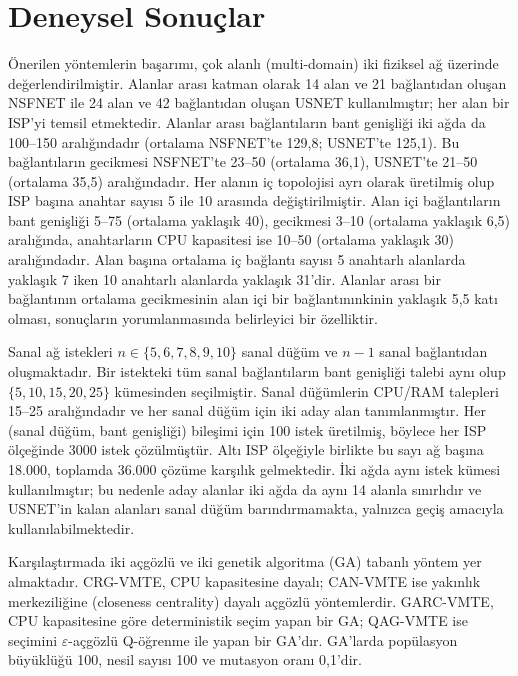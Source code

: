 \documentclass[10pt,twocolumn]{article}
\begin{document}
\section{Deneysel Sonuçlar}

Önerilen yöntemlerin başarımı, çok alanlı (multi-domain) iki fiziksel ağ üzerinde değerlendirilmiştir. Alanlar arası katman olarak 14 alan ve 21 bağlantıdan oluşan NSFNET ile 24 alan ve 42 bağlantıdan oluşan USNET kullanılmıştır; her alan bir ISP'yi temsil etmektedir. Alanlar arası bağlantıların bant genişliği iki ağda da 100--150 aralığındadır (ortalama NSFNET'te 129,8; USNET'te 125,1). Bu bağlantıların gecikmesi NSFNET'te 23--50 (ortalama 36,1), USNET'te 21--50 (ortalama 35,5) aralığındadır. Her alanın iç topolojisi ayrı olarak üretilmiş olup ISP başına anahtar sayısı 5 ile 10 arasında değiştirilmiştir. Alan içi bağlantıların bant genişliği 5--75 (ortalama yaklaşık 40), gecikmesi 3--10 (ortalama yaklaşık 6,5) aralığında, anahtarların CPU kapasitesi ise 10--50 (ortalama yaklaşık 30) aralığındadır. Alan başına ortalama iç bağlantı sayısı 5 anahtarlı alanlarda yaklaşık 7 iken 10 anahtarlı alanlarda yaklaşık 31'dir. Alanlar arası bir bağlantının ortalama gecikmesinin alan içi bir bağlantınınkinin yaklaşık 5,5 katı olması, sonuçların yorumlanmasında belirleyici bir özelliktir.

Sanal ağ istekleri $n \in \{5,6,7,8,9,10\}$ sanal düğüm ve $n-1$ sanal bağlantıdan oluşmaktadır. Bir istekteki tüm sanal bağlantıların bant genişliği talebi aynı olup $\{5,10,15,20,25\}$ kümesinden seçilmiştir. Sanal düğümlerin CPU/RAM talepleri 15--25 aralığındadır ve her sanal düğüm için iki aday alan tanımlanmıştır. Her (sanal düğüm, bant genişliği) bileşimi için 100 istek üretilmiş, böylece her ISP ölçeğinde 3000 istek çözülmüştür. Altı ISP ölçeğiyle birlikte bu sayı ağ başına 18.000, toplamda 36.000 çözüme karşılık gelmektedir. İki ağda aynı istek kümesi kullanılmıştır; bu nedenle aday alanlar iki ağda da aynı 14 alanla sınırlıdır ve USNET'in kalan alanları sanal düğüm barındırmamakta, yalnızca geçiş amacıyla kullanılabilmektedir.

Karşılaştırmada iki açgözlü ve iki genetik algoritma (GA) tabanlı yöntem yer almaktadır. CRG-VMTE, CPU kapasitesine dayalı; CAN-VMTE ise yakınlık merkeziliğine (closeness centrality) dayalı açgözlü yöntemlerdir. GARC-VMTE, CPU kapasitesine göre deterministik seçim yapan bir GA; QAG-VMTE ise seçimini $\varepsilon$-açgözlü Q-öğrenme ile yapan bir GA'dır. GA'larda popülasyon büyüklüğü 100, nesil sayısı 100 ve mutasyon oranı 0,1'dir.
\end{document}
